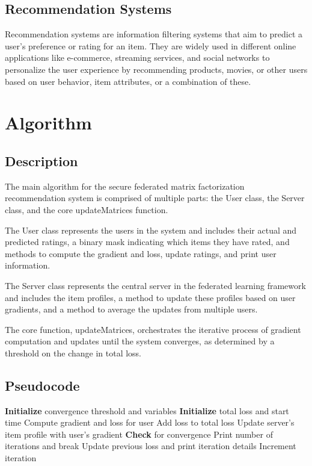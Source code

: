 \documentclass{article}
\begin{document}
\subsection{Recommendation Systems}
Recommendation systems are information filtering systems that aim to predict a user's preference or rating for an item. They are widely used in different online applications like e-commerce, streaming services, and social networks to personalize the user experience by recommending products, movies, or other users based on user behavior, item attributes, or a combination of these.



\section{Algorithm}

\subsection{Description}
The main algorithm for the secure federated matrix factorization recommendation system is comprised of multiple parts: the User class, the Server class, and the core updateMatrices function.

The User class represents the users in the system and includes their actual and predicted ratings, a binary mask indicating which items they have rated, and methods to compute the gradient and loss, update ratings, and print user information.

The Server class represents the central server in the federated learning framework and includes the item profiles, a method to update these profiles based on user gradients, and a method to average the updates from multiple users.

The core function, updateMatrices, orchestrates the iterative process of gradient computation and updates until the system converges, as determined by a threshold on the change in total loss.

\subsection{Pseudocode}
\begin{algorithm}[H]
\caption{}\label{algo}
\begin{algorithmic}[1]
  \STATE \textbf{Initialize} convergence threshold and variables
    \STATE \textbf{Initialize} total loss and start time
      \STATE Compute gradient and loss for user
      \STATE Add loss to total loss
      \STATE Update server's item profile with user's gradient
    \ENDFOR
    \STATE \textbf{Check} for convergence
      \STATE Print number of iterations and break
    \ELSE
      \STATE Update previous loss and print iteration details
    \ENDIF
    \STATE Increment iteration
  \ENDWHILE
\end{algorithmic}
\end{algorithm}
\end{document}
